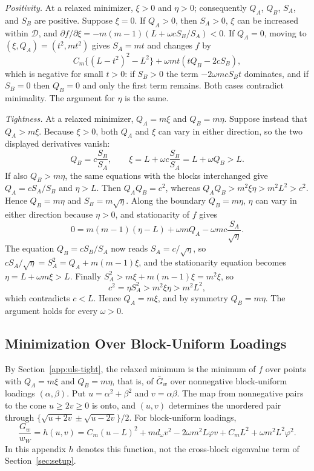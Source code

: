 \emph{Positivity.} At a relaxed minimizer, $\xi>0$ and $\eta>0$; consequently $Q_A$, $Q_B$, $S_A$, and $S_B$ are positive. Suppose $\xi=0$. If $Q_A>0$, then $S_A>0$, $\xi$ can be increased within $\mathcal D$, and $\partial f/\partial\xi=-m(m-1)(L+\omega cS_B/S_A)<0$. If $Q_A=0$, moving to $(\xi,Q_A)=(t^2,mt^2)$ gives $S_A=mt$ and changes $f$ by
\[
C_m\{(L-t^2)^2-L^2\}+\omega mt\left(tQ_B-2cS_B\right),
\]
which is negative for small $t>0$: if $S_B>0$ the term $-2\omega mcS_Bt$ dominates, and if $S_B=0$ then $Q_B=0$ and only the first term remains. Both cases contradict minimality. The argument for $\eta$ is the same.

\emph{Tightness.} At a relaxed minimizer, $Q_A=m\xi$ and $Q_B=m\eta$. Suppose instead that $Q_A>m\xi$. Because $\xi>0$, both $Q_A$ and $\xi$ can vary in either direction, so the two displayed derivatives vanish:
\[
Q_B=c\frac{S_B}{S_A},\qquad \xi=L+\omega c\frac{S_B}{S_A}=L+\omega Q_B>L .
\]
If also $Q_B>m\eta$, the same equations with the blocks interchanged give $Q_A=cS_A/S_B$ and $\eta>L$. Then $Q_AQ_B=c^2$, whereas $Q_AQ_B>m^2\xi\eta>m^2L^2>c^2$. Hence $Q_B=m\eta$ and $S_B=m\sqrt\eta$. Along the boundary $Q_B=m\eta$, $\eta$ can vary in either direction because $\eta>0$, and stationarity of $f$ gives
\[
0=m(m-1)(\eta-L)+\omega mQ_A-\omega mc\frac{S_A}{\sqrt\eta}.
\]
The equation $Q_B=cS_B/S_A$ now reads $S_A=c/\sqrt\eta$, so $cS_A/\sqrt\eta=S_A^2=Q_A+m(m-1)\xi$, and the stationarity equation becomes $\eta=L+\omega m\xi>L$. Finally $S_A^2>m\xi+m(m-1)\xi=m^2\xi$, so
\[
c^2=\eta S_A^2>m^2\xi\eta>m^2L^2,
\]
which contradicts $c<L$. Hence $Q_A=m\xi$, and by symmetry $Q_B=m\eta$. The argument holds for every $\omega>0$.

\subsection{Minimization Over Block-Uniform Loadings}
\label{app:uls-cone}

By Section~\ref{app:uls-tight}, the relaxed minimum is the minimum of $f$ over points with $Q_A=m\xi$ and $Q_B=m\eta$, that is, of $\bar G_w$ over nonnegative block-uniform loadings $(\alpha,\beta)$. Put $u=\alpha^2+\beta^2$ and $v=\alpha\beta$. The map from nonnegative pairs to the cone $u\ge2v\ge0$ is onto, and $(u,v)$ determines the unordered pair through $\{\sqrt{u+2v}\pm\sqrt{u-2v}\}/2$. For block-uniform loadings,
\[
\frac{G_w}{w_W}
=h(u,v)=C_m(u-L)^2+md_\omega v^2
-2\omega m^2L\varphi v+C_mL^2+\omega m^2L^2\varphi^2.
\]
In this appendix $h$ denotes this function, not the cross-block eigenvalue term of Section~\ref{sec:setup}.

